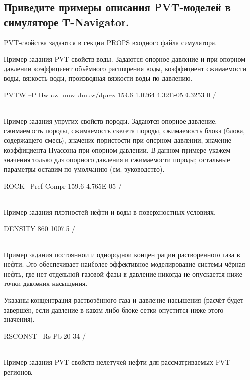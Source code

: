 

\subsection{Приведите примеры описания PVT-моделей в симуляторе T-Navigator.}

PVT-свойства задаются в секции PROPS входного файла симулятора.


Пример задания PVT-свойств воды.
Задаются опорное давление и при опорном давлении коэффициент объёмного расширения воды, коэффициент сжимаемости воды, вязкость воды, производная вязкости воды по давлению.
\begin{eclrun}
PVTW          
--P    Bw      cw        muw     dmuw/dpres  
159.6  1.0264  4.32E-05  0.3253  0  /
\end{eclrun}
\ \\

Пример задания упругих свойств породы.
Задаются опорное давление, сжимаемость породы, сжимаемость скелета породы, сжимаемость блока (блока, содержащего смесь), значение пористости при опорном давлении, значение коэффициента Пуассона при опорном давлении.
В данном примере укажем значения только для опорного давления и сжимаемости породы; остальные параметры оставим по умолчанию (см. руководство).
\begin{eclrun}
ROCK
--Pref  Compr 
159.6  4.765E-05  /
\end{eclrun}
\ \\

Пример задания плотностей нефти и воды в поверхностных условиях.
\begin{eclrun}
DENSITY 
860  1007.5  /
\end{eclrun}
\ \\

Пример задания постоянной и однородной концентрации растворённого газа в нефти.
Это обеспечивает наиболее эффективное моделирование системы чёрная нефть, где нет отдельной газовой фазы и давление никогда не опускается ниже точки давления насыщения.

Указаны концентрация растворённого газа и давление насыщения (расчёт будет завершён, если давление в каком-либо блоке сетки опустится ниже этого значения).
\begin{eclrun}
RSCONST 
--Rs  Pb
  20  34  /
\end{eclrun}
\ \\

Пример задания PVT-свойств нелетучей нефти для рассматриваемых PVT-регионов.

